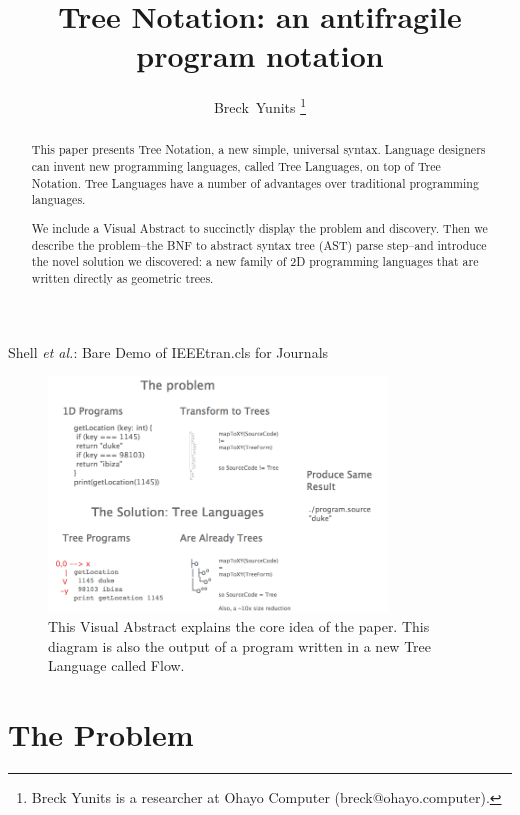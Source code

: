 \documentclass[journal]{IEEEtran}
\begin{document}
\title{Tree Notation: an antifragile program notation}

\author{Breck~Yunits%
\thanks{Breck Yunits is a researcher at Ohayo Computer (breck@ohayo.computer).}%
}

%
{Shell \MakeLowercase{\textit{et al.}}: Bare Demo of IEEEtran.cls for Journals}

\maketitle


\begin{abstract}
This paper presents Tree Notation, a new simple, universal syntax. Language designers can invent new programming languages, called Tree Languages, on top of Tree Notation. Tree Languages have a number of advantages over traditional programming languages.

We include a Visual Abstract to succinctly display the problem and discovery. Then we describe the problem--the BNF to abstract syntax tree (AST) parse step--and introduce the novel solution we discovered: a new family of 2D programming languages that are written directly as geometric trees.
\end{abstract}

\IEEEpeerreviewmaketitle

\begin{figure}[ht!]
\centering
\includegraphics[width=90mm]{treenotation.png}
\caption{This Visual Abstract explains the core idea of the paper. This diagram is also the output of a program written in a new Tree Language called Flow.}
\end{figure}

\section{The Problem}
\end{document}
